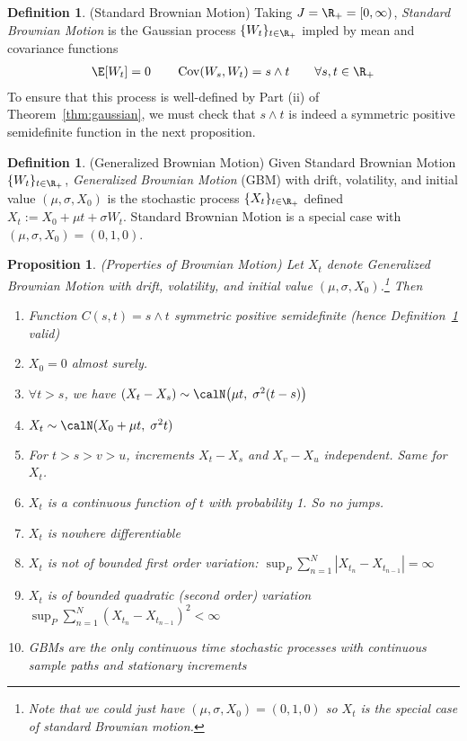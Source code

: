 \documentclass[12pt]{article}
\theoremstyle{plain}
\newtheorem{prop}[thm]{Proposition}
\theoremstyle{definition}
\newtheorem{defn}[thm]{Definition}
\theoremstyle{remark}
\newcommand{\Cov}{\operatorname{Cov}}
\newcommand{\sumnN}{\sum^N_{n=1}}
\begin{document}
\begin{defn}(Standard Brownian Motion)
\label{defn:stdbrownian}
Taking $J=\R_+=[0,\infty)$, \emph{Standard Brownian Motion} is the
Gaussian process $\{W_t\}_{t\in\R_+}$ impled by mean and covariance
functions
\begin{align*}
  \E[W_t]=0
  \qquad
  \Cov(W_s,W_t) = s \wedge t
  \qquad \forall s,t\in\R_+
\end{align*}
To ensure that this process is well-defined by Part (ii) of
Theorem~\ref{thm:gaussian}, we must check that $s\wedge t$ is indeed a
symmetric positive semidefinite function in the next proposition.
\end{defn}

\begin{defn}(Generalized Brownian Motion)
Given Standard Brownian Motion $\{W_t\}_{t\in\R_+}$,
\emph{Generalized Brownian Motion} (GBM) with drift, volatility, and
initial value $(\mu,\sigma,X_0)$ is the stochastic process
$\{X_t\}_{t\in\R_+}$ defined $X_t := X_0+\mu t + \sigma W_t$.
Standard Brownian Motion is a special case with
$(\mu,\sigma,X_0)=(0,1,0)$.
\end{defn}


\begin{prop}\emph{(Properties of Brownian Motion)}
Let $X_t$ denote Generalized Brownian Motion with drift, volatility, and
initial value $(\mu,\sigma,X_0)$.\footnote{%
  Note that we could just have $(\mu,\sigma,X_0)=(0,1,0)$ so $X_t$ is
  the special case of standard Brownian motion.
}
Then
\begin{enumerate}[label=\emph{(\roman*)}]
  \item
    Function $C(s,t)=s\wedge t$ symmetric positive semidefinite
    (hence Definition~\ref{defn:stdbrownian} valid)
  \item $X_0=0$ almost surely.
  \item $\forall t>s$, we have $(X_t-X_s)\sim
    \calN\big(\mu t,\;\sigma^2(t-s)\big)$
   \item $X_t\sim \calN(X_0+\mu t,\; \sigma^2 t)$
  \item For $t>s>v>u$, increments $X_t-X_s$ and $X_v-X_u$ independent.
    Same for $X_t$.
  \item $X_t$ is a continuous function of $t$ with probability 1.
    So no jumps.
  \item $X_t$ is nowhere differentiable
  \item $X_t$ is \emph{not} of bounded first order variation:
    $\sup_P \sumnN |X_{t_n}-X_{t_{n-1}}|=\infty$
  \item $X_t$ is of bounded \emph{quadratic} (second order)
    variation $\sup_P \sumnN (X_{t_n}-X_{t_{n-1}})^2 <\infty$
  \item GBMs are the only continuous time stochastic processes with
    continuous sample paths and stationary increments
\end{enumerate}
\end{prop}
\end{document}
